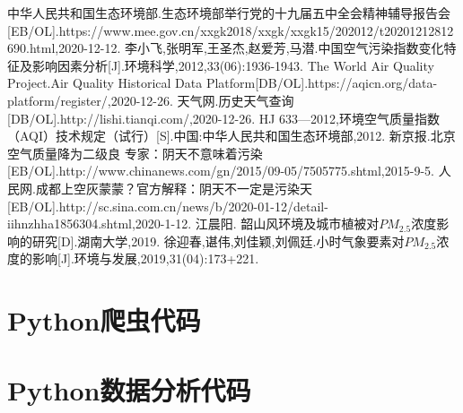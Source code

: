\documentclass[UTF8,a4paper,10pt]{article}
\begin{document}
\newpage
\small
\begin{thebibliography}{99}
    \setlength{\parskip}{0pt}  %
     中华人民共和国生态环境部.生态环境部举行党的十九届五中全会精神辅导报告会[EB/OL].https://www.mee.gov.cn/xxgk2018/xxgk/xxgk15/202012/t20201212812690.html,2020-12-12.
     李小飞,张明军,王圣杰,赵爱芳,马潜.中国空气污染指数变化特征及影响因素分析[J].环境科学,2012,33(06):1936-1943.
     The World Air Quality Project.Air Quality Historical Data Platform[DB/OL].https://aqicn.org/data-platform/register/,2020-12-26.
     天气网.历史天气查询[DB/OL].http://lishi.tianqi.com/,2020-12-26.
     HJ 633—2012,环境空气质量指数（AQI）技术规定（试行）[S].中国:中华人民共和国生态环境部,2012.
     新京报.北京空气质量降为二级良 专家：阴天不意味着污染[EB/OL].http://www.chinanews.com/gn/2015/09-05/7505775.shtml,2015-9-5.
     人民网.成都上空灰蒙蒙？官方解释：阴天不一定是污染天[EB/OL].http://sc.sina.com.cn/news/b/2020-01-12/detail-iihnzhha1856304.shtml,2020-1-12.
     江晨阳. 韶山风环境及城市植被对$PM_{2.5}$浓度影响的研究[D].湖南大学,2019.
     徐迎春,谌伟,刘佳颖,刘佩廷.小时气象要素对$PM_{2.5}$浓度的影响[J].环境与发展,2019,31(04):173+221.
\end{thebibliography}

\newpage
\begin{appendices}
    \section{Python爬虫代码}
    

    \section{Python数据分析代码}
    
 \end{appendices}

\clearpage
\end{document}
